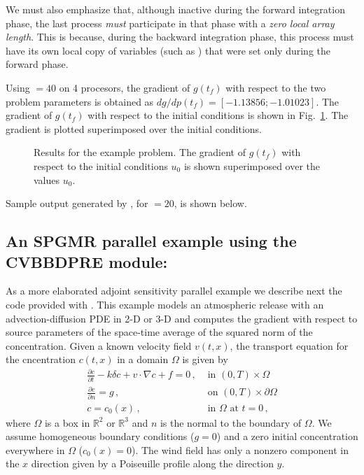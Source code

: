 We must also emphasize that, although inactive during the forward integration phase, 
the last process {\em must} participate in that phase with a 
{\em zero local array length}. 
This is because, during the backward integration phase, this process must
have its own local copy of variables (such as ) that were set
only during the forward phase.

Using  $=40$ on 4 procesors, the gradient of $g(t_f)$ with respect to 
the two problem parameters is obtained as $dg/dp(t_f) = [ -1.13856; -1.01023]$.
The gradient of $g(t_f)$ with respect to the initial conditions is shown in
Fig.~\ref{f:pvanx}. The gradient is plotted superimposed over the initial conditions.
\begin{figure}
  {\centerline{}}
  \caption[Results for the  example problem.]
  {Results for the  example problem.
    The gradient of $g(t_f)$ with respect to the initial conditions $u_0$ 
    is shown superimposed over the values $u_0$.}
  \label{f:pvanx}
\end{figure}
Sample output generated by , for  $=20$, is shown below.

\vspace{0.1in}


\newpage
\subsection{An SPGMR parallel example using the CVBBDPRE module: }
\label{ss:pvakx}

As a more elaborated adjoint sensitivity parallel example we describe next
the  code provided with {\cvodes}. This example models an atmospheric 
release with an advection-diffusion PDE in 2-D or 3-D and computes the gradient 
with respect to source parameters of the space-time average of the squared norm
of the concentration.
Given a known velocity field $v(t,x)$, the transport equation for
the cncentration $c(t,x)$ in a domain $\Omega$ is given by
\begin{equation}\label{e:pvakx_PDE}
  \begin{split}
    \frac{\partial c}{\partial t} - k \delta c + v \cdot \nabla c + f = 0 \, , 
    &\text{ in } (0,T) \times \Omega \\
    \frac{\partial c}{\partial n} = g \, ,
    &\text{ on } (0,T) \times \partial\Omega \\
    c = c_0(x) \, ,
    &\text{ in } \Omega \text{ at } t = 0 \, ,
  \end{split}
\end{equation}
where $\Omega$ is a box in ${\mathbb R}^2$ or ${\mathbb R}^3$ and $n$ is the 
normal to the boundary of $\Omega$.
We assume homogeneous boundary conditions ($g = 0$) and a zero initial
concentration everywhere in $\Omega$ ($c_0(x) = 0$). The wind field has only a
nonzero component in the $x$ direction given by a Poiseuille profile along the 
direction $y$.

